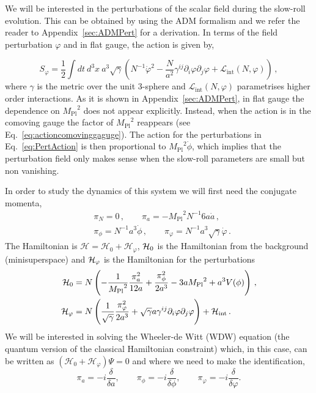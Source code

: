 \documentclass[a4paper,11pt]{article}
\numberwithin{equation}{section}
\newcommand{\mpl}{{M_{\mathrm{Pl}}}}
\numberwithin{equation}{section}
\begin{document}
We will be interested in the perturbations of the scalar field during the slow-roll evolution. This can be obtained by using the ADM formalism and we refer the reader to Appendix~\ref{sec:ADMPert} for a derivation. In terms of the field perturbation $\varphi$ and in flat gauge, the action is given by,

\begin{equation}
S_\varphi=\frac{1}{2}\int dt\ d^3 x\  a^{3}\sqrt{\gamma}\left(N^{-1}\dot\varphi^2-\frac{N}{a^2}\gamma^{ij}\partial_i\varphi\partial_j\varphi+\mathcal{L}_{\mathrm{int}}(N,\varphi)\right) \,,\label{eq:PertAction}
\end{equation}
where $\gamma$ is the metric over the unit 3-sphere and $\mathcal{L}_{\mathrm{int}}(N,\varphi)$ parametrises higher order interactions. As it is shown in Appendix~\ref{sec:ADMPert}, in flat gauge  the dependence on $\mpl^2$ does not appear explicitly. Instead, when the action is  in the comoving gauge the factor of $\mpl^2$ reappears (see Eq.~\eqref{eq:actioncomovinggaguge}).  The action for the perturbations in Eq.~\eqref{eq:PertAction} is then   proportional to $\mpl^2\dot\phi$, which implies that the  perturbation field  only makes sense when the slow-roll parameters are small but non vanishing.

 In order to study the dynamics of this system we will first need the   conjugate momenta,
\begin{align}
&\pi_{N}=0\,, \qquad \pi_{a}=-\mpl^2 N^{-1}6a\dot{a} \,,\label{eq:momenta}\nonumber\\
&\pi_{\phi}=N^{-1}a^{3}\dot{\phi} \,, \qquad \pi_{\varphi}=N^{-1}a^3\sqrt{\gamma}\dot\varphi \,.
\end{align}
The Hamiltonian is $\mathcal{H}=\mathcal{H}_0+\mathcal{H}_\varphi$, ${\cal H}_0$ is the Hamiltonian from the background (minisuperspace) and ${\cal H}_\varphi$ is the Hamiltonian for the perturbations
\begin{align}
{\cal H}_0&=N\left(-\frac{1}{\mpl^2}\frac{\pi_{a}^{2}}{12a}+\frac{\pi_{\phi}^{2}}{2a^{3}}-3a\mpl^2+a^{3}V(\phi)\right) \,,\label{eq:calH}\nonumber\\
{\cal H}_\varphi&=N\left(\frac{1}{\sqrt{\gamma}}\frac{\pi_\varphi^2}{2 a^3}+\sqrt{\gamma}a\gamma^{ij}\partial_i\varphi\partial_j\varphi\right)+{\cal H}_{\mathrm{int}} \,.
\end{align}
We will be interested in solving the Wheeler-de Witt (WDW) equation (the quantum version of the classical Hamiltonian constraint) which, in this case, can be written as $\left(\mathcal{H}_0+\mathcal{H}_\varphi\right)\Psi=0$ and where we need to make the identification,
\begin{equation}
\pi_a=-i\frac{\delta}{\delta a},\qquad\pi_\phi=-i\frac{\delta}{\delta\phi},\qquad\pi_\varphi=-i\frac{\delta}{\delta\varphi}.
\end{equation}
\end{document}
